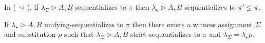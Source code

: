 \documentclass[UKenglish]{lipics-v2019}
\makeatletter
\newcommand\+{+}
\renewcommand\*{\times}
\newcommand\net[3]{#1\triangleright #2,#3}
\newcommand\join{\vee}
\newcommand\link[3][\sigma]{(#2,#3)_{#1}}
\newcommand\scoal{\rightarrow} %
\newcommand\ucoal{\rightsquigarrow}
\newcommand\urr[1]{
  \ifx#1+\expandafter\@urr\else
  \ifx#1*\*\mathrm U\else
  \ifx#1!\forall\mathrm U\else
  \ifx#1?\exists\mathrm U\else 
  \ifx#11\mathrm{axU}\else
  #1\mathrm U
  \fi\fi\fi\fi\fi
}
\newcommand\@urr[1]{+\mathrm U,{#1}}
\makeatother
\begin{document}
\begin{lemma}
\label{lem:ucoal generality}
In ($\ucoal$), if $\net{\lambda_\Sigma}AB$ sequentializes to $\pi$ then $\net{\lambda_\star}AB$ sequentializes to $\pi'\leq\pi$.
\end{lemma}


\begin{lemma}
\label{lem:unifying implies strict coalescence}
If $\net{\lambda_\star}AB$ unifying-sequentializes to $\pi$ then there exists a witness assignment $\Sigma$ and substitution $\rho$ such that $\net{\lambda_\Sigma}AB$ strict-sequentializes to $\pi$ and $\lambda_\Sigma=\lambda_\star\rho$.
\end{lemma}

\end{document}
